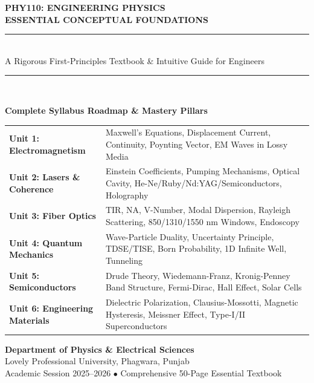 \begin{titlepage}
\begin{center}
\vspace*{1.5cm}

{\Huge\bfseries\color{LPUNavy} PHY110: ENGINEERING PHYSICS}\\[0.5cm]
{\LARGE\bfseries\color{LPUOrange} ESSENTIAL CONCEPTUAL FOUNDATIONS}\\[1cm]

\rule{\textwidth}{1.5pt}\\[0.6cm]
{\Large\color{DarkSlate} A Rigorous First-Principles Textbook \& Intuitive Guide for Engineers}\\[0.6cm]
\rule{\textwidth}{1.5pt}\\[1.5cm]

\begin{tcolorbox}[colback=white,colframe=LPUNavy,arc=3mm,width=0.88\textwidth]
\centering
\textbf{\large Complete Syllabus Roadmap \& Mastery Pillars}\\[3mm]
\small
\begin{tabularx}{\textwidth}{l X}
\textbf{Unit 1: Electromagnetism} & Maxwell's Equations, Displacement Current, Continuity, Poynting Vector, EM Waves in Lossy Media \\
\textbf{Unit 2: Lasers \& Coherence} & Einstein Coefficients, Pumping Mechanisms, Optical Cavity, He-Ne/Ruby/Nd:YAG/Semiconductors, Holography \\
\textbf{Unit 3: Fiber Optics} & TIR, NA, V-Number, Modal Dispersion, Rayleigh Scattering, 850/1310/1550 nm Windows, Endoscopy \\
\textbf{Unit 4: Quantum Mechanics} & Wave-Particle Duality, Uncertainty Principle, TDSE/TISE, Born Probability, 1D Infinite Well, Tunneling \\
\textbf{Unit 5: Semiconductors} & Drude Theory, Wiedemann-Franz, Kronig-Penney Band Structure, Fermi-Dirac, Hall Effect, Solar Cells \\
\textbf{Unit 6: Engineering Materials} & Dielectric Polarization, Clausius-Mossotti, Magnetic Hysteresis, Meissner Effect, Type-I/II Superconductors \\
\end{tabularx}
\end{tcolorbox}

\vfill
{\large\bfseries Department of Physics \& Electrical Sciences}\\[0.2cm]
{\large Lovely Professional University, Phagwara, Punjab}\\[0.5cm]
{\small Academic Session 2025--2026 $\bullet$ Comprehensive 50-Page Essential Textbook}

\end{center}
\end{titlepage}
